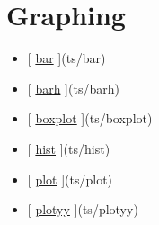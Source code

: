 \documentclass[letterpaper,10pt,english]{sphinxmanual}
\begin{document}
\section{Graphing}
\label{classes/time_series/@ts/ts:graphing}\begin{itemize}
\item {} 
{[} {\hyperref[classes/time_series/@ts/ts:bar]{bar}} {]}(ts/bar)

\item {} 
{[} {\hyperref[classes/time_series/@ts/ts:barh]{barh}} {]}(ts/barh)

\item {} 
{[} {\hyperref[classes/time_series/@ts/ts:boxplot]{boxplot}} {]}(ts/boxplot)

\item {} 
{[} {\hyperref[classes/time_series/@ts/ts:hist]{hist}} {]}(ts/hist)

\item {} 
{[} {\hyperref[classes/time_series/@ts/ts:plot]{plot}} {]}(ts/plot)

\item {} 
{[} {\hyperref[classes/time_series/@ts/ts:plotyy]{plotyy}} {]}(ts/plotyy)

\end{itemize}
\end{document}
